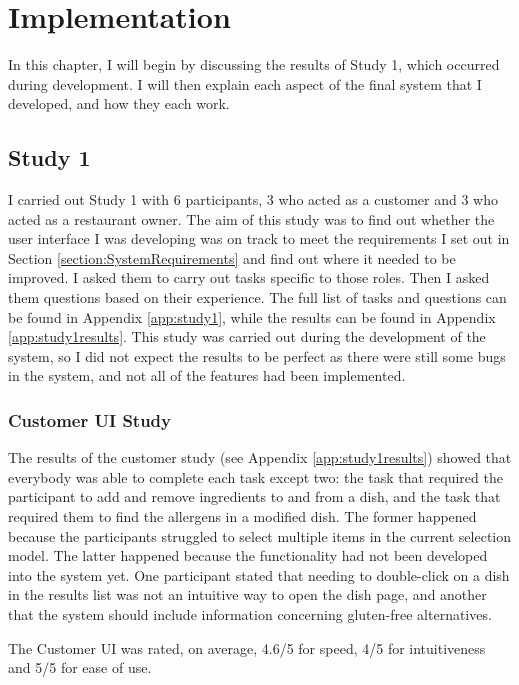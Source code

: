 \chapter{Implementation}

In this chapter, I will begin by discussing the results of Study 1, which occurred during development. I will then explain each aspect of the final system that I developed, and how they each work.

\section{Study 1}
\label{section:Study1Results}

I carried out Study 1 with 6 participants, 3 who acted as a customer and 3 who acted as a restaurant owner. The aim of this study was to find out whether the user interface I was developing was on track to meet the requirements I set out in Section \ref{section:SystemRequirements} and find out where it needed to be improved. I asked them to carry out tasks specific to those roles. Then I asked them questions based on their experience. The full list of tasks and questions can be found in Appendix \ref{app:study1}, while the results can be found in Appendix \ref{app:study1results}. This study was carried out during the development of the system, so I did not expect the results to be perfect as there were still some bugs in the system, and not all of the features had been implemented.

\subsection{Customer UI Study}

The results of the customer study (see Appendix \ref{app:study1results}) showed that everybody was able to complete each task except two: the task that required the participant to add and remove ingredients to and from a dish, and the task that required them to find the allergens in a modified dish. The former happened because the participants struggled to select multiple items in the current selection model. The latter happened because the functionality had not been developed into the system yet. One participant stated that needing to double-click on a dish in the results list was not an intuitive way to open the dish page, and another that the system should include information concerning gluten-free alternatives.

The Customer UI was rated, on average, 4.6/5 for speed, 4/5 for intuitiveness and 5/5 for ease of use.

